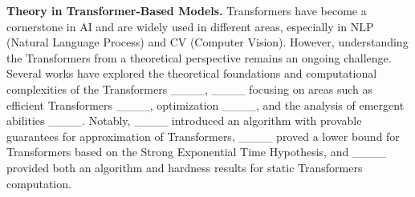 {\bf Theory in Transformer-Based Models.}
Transformers have become a cornerstone in AI and are widely used in different areas, especially in NLP (Natural Language Process) and CV (Computer Vision). However, understanding the Transformers from a theoretical perspective remains an ongoing challenge. Several works have explored the theoretical foundations and computational complexities of the Transformers 
\ifdefined\isarxiv
____, 
\else
____
\fi
focusing on areas such as efficient Transformers ____, optimization ____, and the analysis of emergent abilities ____. Notably, ____ introduced an algorithm with provable guarantees for approximation of Transformers, ____ proved a lower bound for Transformers based on the Strong Exponential Time Hypothesis, and ____ provided both an algorithm and hardness results for static Transformers computation.
\ifdefined\isarxiv
\else
\vspace{-3mm}
\fi